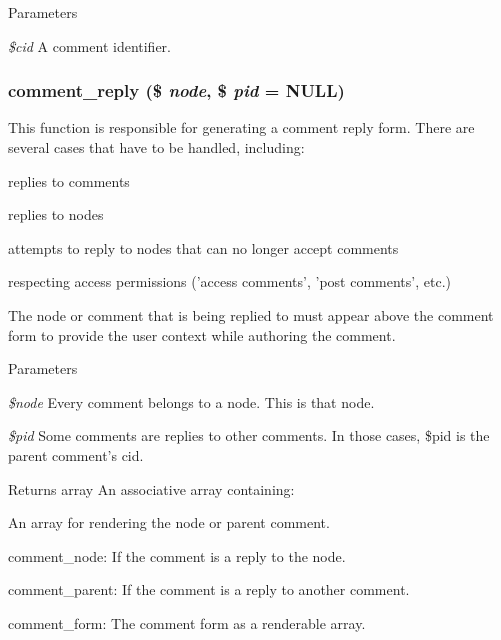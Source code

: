 \begin{DoxyParams}{Parameters}
\item[{\em \$cid}]A comment identifier. \end{DoxyParams}
\hypertarget{comment_8pages_8inc_a1701de5fe8481441a5f48cf818aec5b1}{
\subsubsection[{comment\_\-reply}]{\setlength{\rightskip}{0pt plus 5cm}comment\_\-reply (\$ {\em node}, \/  \$ {\em pid} = {\ttfamily NULL})}}
\label{comment_8pages_8inc_a1701de5fe8481441a5f48cf818aec5b1}
This function is responsible for generating a comment reply form. There are several cases that have to be handled, including:
\begin{DoxyItemize}
\item replies to comments
\item replies to nodes
\item attempts to reply to nodes that can no longer accept comments
\item respecting access permissions ('access comments', 'post comments', etc.)
\end{DoxyItemize}

The node or comment that is being replied to must appear above the comment form to provide the user context while authoring the comment.


\begin{DoxyParams}{Parameters}
\item[{\em \$node}]Every comment belongs to a node. This is that node.\item[{\em \$pid}]Some comments are replies to other comments. In those cases, \$pid is the parent comment's cid.\end{DoxyParams}
\begin{DoxyReturn}{Returns}
array An associative array containing:
\begin{DoxyItemize}
\item An array for rendering the node or parent comment.
\begin{DoxyItemize}
\item comment\_\-node: If the comment is a reply to the node.
\item comment\_\-parent: If the comment is a reply to another comment.
\end{DoxyItemize}
\item comment\_\-form: The comment form as a renderable array. 
\end{DoxyItemize}
\end{DoxyReturn}
